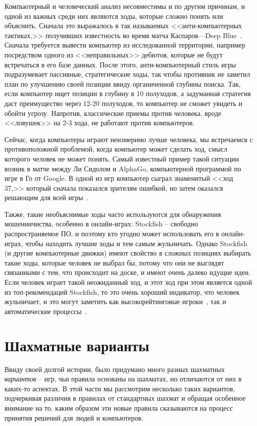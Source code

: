 \documentclass{article}
\begin{document}
Компьютерный и человеческий анализ несовместимы и по другим причинам,
и одной из важных среди них являются ходы, которые сложно понять или объяснить.
Сначала это выражалось в так называемых <<анти-компьютерных тактиках,>>
получивших известность во время матча Каспаров---Deep Blue~\cite{kasparov-anti-computer-chess}.
Сначала требуется вывести компьютер из исследованной территории,
например посредством одного из <<неправильных>> дебютов,
которые не будут встречаться в его базе данных.
После этого, анти-компьютерный стиль игры подразумевает пассивные, стратегические ходы,
так чтобы противник не заметил план по улучшению своей позиции ввиду органиченной глубины поиска.
Так, если компьютер ищет позиции в глубину в 10 полуходов, а задуманная стратегия даст преимущество через
12-20 полуходов, то компьютер не сможет увидеть и обойти угрозу.
Напротив, классические приемы против человека, вроде <<ловушек>> на 2-3 хода,
не работают против компьютеров.

Сейчас, когда компьютеры играют неизмеримо лучше человека,
мы встречаемся с противоположной проблемой,
когда компьютер может сделать ход,
смысл которого человек не может понять.
Самый известный пример такой ситуации возник в матче между Ли Сидолом и AlphaGo,
компьютерной программой по игре в Го от Google.
В одной из игр компьютер сыграл знаменитый <<ход 37,>>
который сначала показался зрителям ошибкой,
но затем оказался решающим для всей игры~\cite{wired-alphago}.

Также, такие необъяснимые ходы часто используются для обнаружения
мошенничиства, особенно в онлайн-играх:
Stockfish -- свободно распространяемое ПО,
и поэтому кто угодно может использовать его в онлайн-играх,
чтобы находить лучшие ходы и тем самым жульничать.
Однако Stockfish (и другие компьютерные движки)
имеют свойство в сложных позициях выбирать такие ходы, которые человек не выбрал бы,
потому что они не выглядят связанными с тем, что происходит на доске,
и имеют очень далеко идущие идеи.
Если человек играет такой неожиданный ход, и этот ход при этом
является одной из топ-рекомендаций Stockfish,
то это очень хороший индикатор, что человек жульничает,
и это могут заметить как высокорейтинговые игроки~\cite{gothamchess-cheater-exposed},
так и автоматические процессы~\cite{lichess-kaladin}.

\section{Шахматные варианты}

Ввиду своей долгой истории, было придумано много разных шахматных \emph{вариантов} --
игр, чьи правила основаны на шахматах, но отличаются от них в каких-то аспектах.
В этой части мы рассмотрим несколько таких вариантов, 
подчеркивая различия в правилах от стандартных шахмат
и обращая особенное внимание на то,
каким образом эти новые правила
сказываются на процесс принятия решений для людей и компьютеров.
\end{document}
